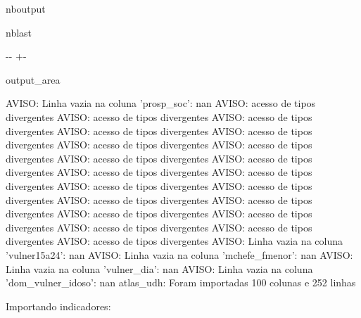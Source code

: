 \documentclass[letterpaper,10pt,brazil]{sphinxmanual}
\newlength\nbsphinxcodecellspacing
\begin{document}
\begin{sphinxuseclass}{nboutput}
\begin{sphinxuseclass}{nblast}
{

\kern-\sphinxverbatimsmallskipamount\kern-\baselineskip
\kern+\FrameHeightAdjust\kern-\fboxrule
\vspace{\nbsphinxcodecellspacing}

\begin{sphinxuseclass}{output_area}
\begin{sphinxuseclass}{}


\begin{sphinxVerbatim}[commandchars=\\\{\}]
AVISO: Linha vazia na coluna 'prosp\_soc': nan
AVISO: acesso de tipos divergentes
AVISO: acesso de tipos divergentes
AVISO: acesso de tipos divergentes
AVISO: acesso de tipos divergentes
AVISO: acesso de tipos divergentes
AVISO: acesso de tipos divergentes
AVISO: acesso de tipos divergentes
AVISO: acesso de tipos divergentes
AVISO: acesso de tipos divergentes
AVISO: acesso de tipos divergentes
AVISO: acesso de tipos divergentes
AVISO: acesso de tipos divergentes
AVISO: acesso de tipos divergentes
AVISO: acesso de tipos divergentes
AVISO: acesso de tipos divergentes
AVISO: acesso de tipos divergentes
AVISO: acesso de tipos divergentes
AVISO: acesso de tipos divergentes
AVISO: acesso de tipos divergentes
AVISO: acesso de tipos divergentes
AVISO: Linha vazia na coluna 'vulner15a24': nan
AVISO: Linha vazia na coluna 'mchefe\_fmenor': nan
AVISO: Linha vazia na coluna 'vulner\_dia': nan
AVISO: Linha vazia na coluna 'dom\_vulner\_idoso': nan
atlas\_udh: Foram importadas 100 colunas e 252 linhas
\end{sphinxVerbatim}



\end{sphinxuseclass}
\end{sphinxuseclass}
}

\end{sphinxuseclass}
\end{sphinxuseclass}
\sphinxAtStartPar
Importando indicadores:
\end{document}
